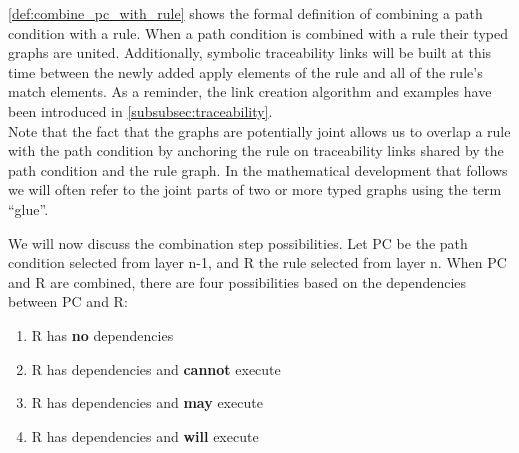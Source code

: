 

\cref{def:combine_pc_with_rule} shows the formal definition of combining a path condition with a rule. When a path condition is combined with a rule their typed graphs are united. Additionally, symbolic traceability links will be built at this time between the newly added apply elements of the rule and all of the rule's match elements. As a reminder, the link creation algorithm and examples have been introduced in \cref{subsubsec:traceability}.\\

Note that the fact that the graphs are potentially joint allows us to overlap a rule with the path condition by anchoring the rule on traceability links shared by the path condition and the rule graph. In the mathematical development that follows we will often refer to the joint parts of two or more typed graphs using the term ``glue''.

We will now discuss the combination step possibilities. Let PC be the path condition selected from layer n-1, and R the rule selected from layer n. When PC and R are combined, there are four possibilities based on the dependencies between PC and R:

\begin{enumerate}
\item R has \textbf{no} dependencies
\item R has dependencies and \textbf{cannot} execute
\item R has dependencies and \textbf{may} execute
\item R has dependencies and \textbf{will} execute
\end{enumerate}

